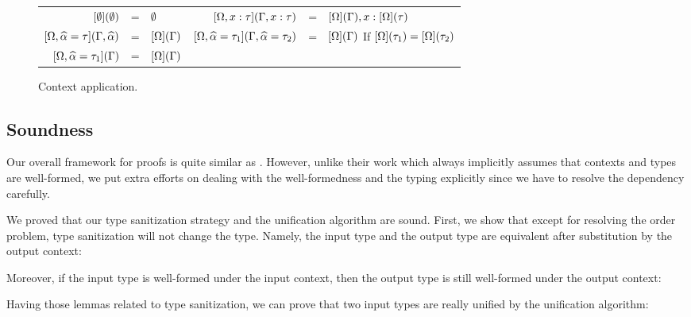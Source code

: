 \begin{figure*}[t]
  \centering
  \begin{tabular}{rlp{2cm}rll}
    $[\emptyset](\emptyset)$ & = & $\emptyset$ &
    $[\Omega, x: \tau](\Gamma, x: \tau)$ & = & $[\Omega](\Gamma), x : [\Omega](\tau) $
    \\
    $[\Omega, \widehat{\alpha} = \tau](\Gamma, \widehat{\alpha})$ & = & $[\Omega](\Gamma)$ &
    $[\Omega, \widehat{\alpha} = \tau_1](\Gamma, \widehat{\alpha} = \tau_2)$ & = & $[\Omega](\Gamma)$
                                    \quad If $[\Omega](\tau_1) = [\Omega](\tau_2)$ \\
    $[\Omega, \widehat{\alpha} = \tau_1](\Gamma)$ & = & $[\Omega](\Gamma)$ \\
  \end{tabular}
    \caption{Context application.}
    \label{fig:context-application-on-context}
\end{figure*}

\subsection{Soundness}

Our overall framework for proofs is quite similar as
\citet{dunfield2013complete}. However, unlike their work which always implicitly assumes
that contexts and types are well-formed, we put extra efforts on
dealing with the well-formedness and the typing explicitly since we
have to resolve the dependency carefully.

We proved that our type sanitization strategy and the unification algorithm
are sound.
First, we show that except for resolving the order problem, type sanitization will not change the
type. Namely, the input type and the output type are equivalent after
substitution by the output context:

\begin{lemma}[\TypeSanitizationEquivalenceName]
  \TypeSanitizationEquivalenceBody
\end{lemma}

Moreover, if the input type is well-formed under the input context, then the
output type is still well-formed under the output context:

\begin{lemma}[\TypeSanitizationWellFormednessName]
  \TypeSanitizationWellFormednessBody
\end{lemma}

Having those lemmas related to type sanitization,
we can prove that two input types are really unified by the
unification algorithm:

